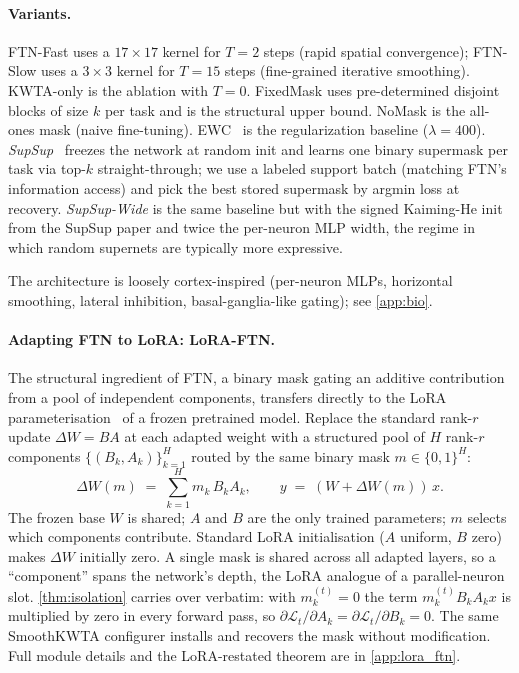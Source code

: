 \documentclass{article}
\theoremstyle{plain}
\theoremstyle{remark}
\begin{document}
\paragraph{Variants.}
FTN-Fast uses a $17\times 17$ kernel for $T{=}2$ steps (rapid spatial convergence); FTN-Slow uses a $3\times 3$ kernel for $T{=}15$ steps (fine-grained iterative smoothing). KWTA-only is the ablation with $T{=}0$. FixedMask uses pre-determined disjoint blocks of size $k$ per task and is the structural upper bound. NoMask is the all-ones mask (naive fine-tuning). EWC~\citep{kirkpatrick2017overcoming} is the regularization baseline ($\lambda{=}400$). \emph{SupSup}~\citep{wortsman2020supermasks} freezes the network at random init and learns one binary supermask per task via top-$k$ straight-through; we use a labeled support batch (matching FTN's information access) and pick the best stored supermask by argmin loss at recovery. \emph{SupSup-Wide} is the same baseline but with the signed Kaiming-He init from the SupSup paper and twice the per-neuron MLP width, the regime in which random supernets are typically more expressive.

The architecture is loosely cortex-inspired (per-neuron MLPs, horizontal smoothing, lateral inhibition, basal-ganglia-like gating); see \cref{app:bio}.

\paragraph{Adapting FTN to LoRA: LoRA-FTN.}
\label{sec:lora_ftn}
The structural ingredient of FTN, a binary mask gating an additive contribution from a pool of independent components, transfers directly to the LoRA parameterisation~\citep{hu2022lora} of a frozen pretrained model. Replace the standard rank-$r$ update $\Delta W=BA$ at each adapted weight with a structured pool of $H$ rank-$r$ components $\{(B_k,A_k)\}_{k=1}^H$ routed by the same binary mask $m\in\{0,1\}^H$:
\begin{equation}
\label{eq:lora_ftn}
\Delta W(m) \;=\; \sum_{k=1}^{H} m_k\, B_k A_k, \qquad y \;=\; (W + \Delta W(m))\,x.
\end{equation}
The frozen base $W$ is shared; $A$ and $B$ are the only trained parameters; $m$ selects which components contribute. Standard LoRA initialisation ($A$ uniform, $B$ zero) makes $\Delta W$ initially zero. A single mask is shared across all adapted layers, so a ``component'' spans the network's depth, the LoRA analogue of a parallel-neuron slot. \cref{thm:isolation} carries over verbatim: with $m^{(t)}_k=0$ the term $m^{(t)}_k B_k A_k x$ is multiplied by zero in every forward pass, so $\partial\mathcal{L}_t/\partial A_k = \partial\mathcal{L}_t/\partial B_k = 0$. The same SmoothKWTA configurer installs and recovers the mask without modification. Full module details and the LoRA-restated theorem are in \cref{app:lora_ftn}.
\end{document}
